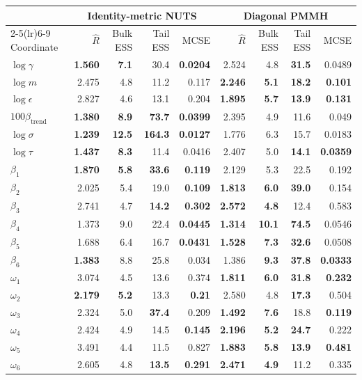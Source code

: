 \begin{tabular}{lrrrrrrrr}
\toprule
& \multicolumn{4}{c}{Identity-metric NUTS} & \multicolumn{4}{c}{Diagonal PMMH} \\
\cmidrule(lr){2-5}\cmidrule(lr){6-9}
Coordinate & $\widehat R$ & Bulk ESS & Tail ESS & MCSE & $\widehat R$ & Bulk ESS & Tail ESS & MCSE \\
\midrule
$\log\gamma$ & \textbf{1.560} & \textbf{7.1} & 30.4 & \textbf{0.0204} & 2.524 & 4.8 & \textbf{31.5} & 0.0489 \\
$\log m$ & 2.475 & 4.8 & 11.2 & 0.117 & \textbf{2.246} & \textbf{5.1} & \textbf{18.2} & \textbf{0.101} \\
$\log\epsilon$ & 2.827 & 4.6 & 13.1 & 0.204 & \textbf{1.895} & \textbf{5.7} & \textbf{13.9} & \textbf{0.131} \\
$100\beta_{\mathrm{trend}}$ & \textbf{1.380} & \textbf{8.9} & \textbf{73.7} & \textbf{0.0399} & 2.395 & 4.9 & 11.6 & 0.049 \\
$\log\sigma$ & \textbf{1.239} & \textbf{12.5} & \textbf{164.3} & \textbf{0.0127} & 1.776 & 6.3 & 15.7 & 0.0183 \\
$\log\tau$ & \textbf{1.437} & \textbf{8.3} & 11.4 & 0.0416 & 2.407 & 5.0 & \textbf{14.1} & \textbf{0.0359} \\
$\beta_1$ & \textbf{1.870} & \textbf{5.8} & \textbf{33.6} & \textbf{0.119} & 2.129 & 5.3 & 22.5 & 0.192 \\
$\beta_2$ & 2.025 & 5.4 & 19.0 & \textbf{0.109} & \textbf{1.813} & \textbf{6.0} & \textbf{39.0} & 0.154 \\
$\beta_3$ & 2.741 & 4.7 & \textbf{14.2} & \textbf{0.302} & \textbf{2.572} & \textbf{4.8} & 12.4 & 0.583 \\
$\beta_4$ & 1.373 & 9.0 & 22.4 & \textbf{0.0445} & \textbf{1.314} & \textbf{10.1} & \textbf{74.5} & 0.0546 \\
$\beta_5$ & 1.688 & 6.4 & 16.7 & \textbf{0.0431} & \textbf{1.528} & \textbf{7.3} & \textbf{32.6} & 0.0508 \\
$\beta_6$ & \textbf{1.383} & 8.8 & 25.8 & 0.034 & 1.386 & \textbf{9.3} & \textbf{37.8} & \textbf{0.0333} \\
$\omega_1$ & 3.074 & 4.5 & 13.6 & 0.374 & \textbf{1.811} & \textbf{6.0} & \textbf{31.8} & \textbf{0.232} \\
$\omega_2$ & \textbf{2.179} & \textbf{5.2} & 13.3 & \textbf{0.21} & 2.580 & 4.8 & \textbf{17.3} & 0.504 \\
$\omega_3$ & 2.324 & 5.0 & \textbf{37.4} & 0.209 & \textbf{1.492} & \textbf{7.6} & 18.8 & \textbf{0.119} \\
$\omega_4$ & 2.424 & 4.9 & 14.5 & \textbf{0.145} & \textbf{2.196} & \textbf{5.2} & \textbf{24.7} & 0.222 \\
$\omega_5$ & 3.491 & 4.4 & 11.5 & 0.827 & \textbf{1.883} & \textbf{5.8} & \textbf{13.9} & \textbf{0.481} \\
$\omega_6$ & 2.605 & 4.8 & \textbf{13.5} & \textbf{0.291} & \textbf{2.471} & \textbf{4.9} & 11.2 & 0.335 \\
\bottomrule
\end{tabular}
